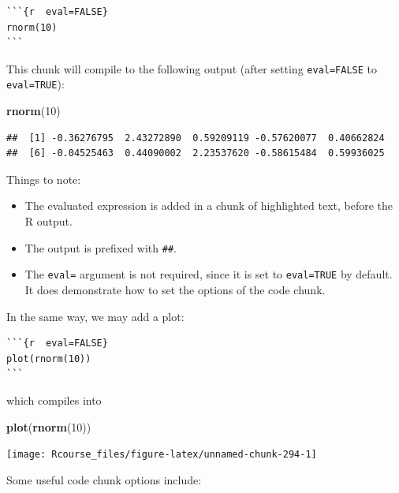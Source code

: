 \documentclass[]{book}
\newenvironment{Shaded}{\begin{snugshade}}{\end{snugshade}}
\newcommand{\KeywordTok}[1]{\textcolor[rgb]{0.13,0.29,0.53}{\textbf{#1}}}
\newcommand{\DecValTok}[1]{\textcolor[rgb]{0.00,0.00,0.81}{#1}}
\newcommand{\NormalTok}[1]{#1}
\providecommand{\tightlist}{%
  \setlength{\itemsep}{0pt}\setlength{\parskip}{0pt}}
\theoremstyle{definition}
\theoremstyle{definition}
\theoremstyle{definition}
\theoremstyle{remark}
\begin{document}
\begin{verbatim}
```{r  eval=FALSE}
rnorm(10)
```
\end{verbatim}

This chunk will compile to the following output (after setting
\texttt{eval=FALSE} to \texttt{eval=TRUE}):

\begin{Shaded}
\begin{Highlighting}[]
\KeywordTok{rnorm}\NormalTok{(}\DecValTok{10}\NormalTok{)}
\end{Highlighting}
\end{Shaded}

\begin{verbatim}
##  [1] -0.36276795  2.43272890  0.59209119 -0.57620077  0.40662824
##  [6] -0.04525463  0.44090002  2.23537620 -0.58615484  0.59936025
\end{verbatim}

Things to note:

\begin{itemize}
\tightlist
\item
  The evaluated expression is added in a chunk of highlighted text,
  before the R output.
\item
  The output is prefixed with \texttt{\#\#}.
\item
  The \texttt{eval=} argument is not required, since it is set to
  \texttt{eval=TRUE} by default. It does demonstrate how to set the
  options of the code chunk.
\end{itemize}

In the same way, we may add a plot:

\begin{verbatim}
```{r  eval=FALSE}
plot(rnorm(10))
```
\end{verbatim}

which compiles into

\begin{Shaded}
\begin{Highlighting}[]
\KeywordTok{plot}\NormalTok{(}\KeywordTok{rnorm}\NormalTok{(}\DecValTok{10}\NormalTok{))}
\end{Highlighting}
\end{Shaded}

\texttt{[image: Rcourse\_files/figure-latex/unnamed-chunk-294-1]}

Some useful code chunk options include:
\end{document}

